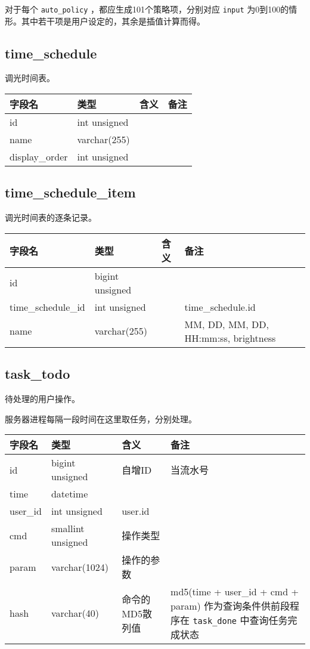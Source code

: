 对于每个 \texttt{auto\_policy} ，都应生成101个策略项，分别对应
\texttt{input}
为0到100的情形。其中若干项是用户设定的，其余是插值计算而得。

\subsection{time\_schedule}\label{timeux5fschedule}

调光时间表。

\begin{longtabu}[c]{@{}lXXX@{}}
\toprule
字段名 & 类型 & 含义 & 备注\tabularnewline
\midrule
\endhead
id & int unsigned & &\tabularnewline
name & varchar(255) & &\tabularnewline
display\_order & int unsigned & &\tabularnewline
\bottomrule
\end{longtabu}

\subsection{time\_schedule\_item}\label{timeux5fscheduleux5fitem}

调光时间表的逐条记录。

\begin{longtabu}[c]{@{}lXXX@{}}
\toprule
字段名 & 类型 & 含义 & 备注\tabularnewline
\midrule
\endhead
id & bigint unsigned & &\tabularnewline
time\_schedule\_id & int unsigned & & time\_schedule.id\tabularnewline
name & varchar(255) & & MM, DD, MM, DD, HH:mm:ss,
brightness\tabularnewline
\bottomrule
\end{longtabu}

\subsection{task\_todo}\label{taskux5ftodo}

待处理的用户操作。

服务器进程每隔一段时间在这里取任务，分别处理。

\begin{longtabu}[c]{@{}lXXX@{}}
\toprule
字段名 & 类型 & 含义 & 备注\tabularnewline
\midrule
\endhead
id & bigint unsigned & 自增ID & 当流水号\tabularnewline
time & datetime & &\tabularnewline
user\_id & int unsigned & user.id &\tabularnewline
cmd & smallint unsigned & 操作类型 &\tabularnewline
param & varchar(1024) & 操作的参数 &\tabularnewline
hash & varchar(40) & 命令的MD5散列值 & md5(time + user\_id + cmd +
param) 作为查询条件供前段程序在 \texttt{task\_done}
中查询任务完成状态\tabularnewline
\bottomrule
\end{longtabu}

